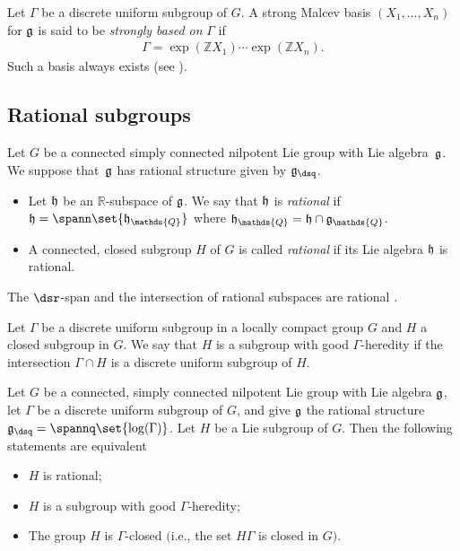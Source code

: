   Let $
\Gamma$ be a discrete uniform subgroup of $G$. A strong Malcev basis
$(X_1,\dotsc,X_n)$ for $\frak g$ is said to be \textit{strongly
based on} $\Gamma$ if
\begin{gather*}%
\Gamma= \exp(\mathds{Z}X_1)\dotsb \exp(\mathds{Z}X_n).
\end{gather*}
 Such a basis always exists (see \cite{Cor1,Matsushima1}).

\subsection{Rational subgroups}\label{2.4}

\begin{definition} Let $G$ be a connected
simply connected nilpotent Lie group with Lie algebra~$\frak g$. We
suppose that~$\frak g$ has rational structure given by $\frak
g_\dsq$.
\begin{itemize}\itemsep=0pt
  \item[$(1)$]
Let  $\frak h$ be an $\mathds{R}$-subspace of $\frak g$.  We say
that $\frak h$ is \textit{rational} if $\frak h = \spann\set{\frak
h_\mathds{Q}}$ where  $\frak h_\mathds{Q}= \frak h \cap \frak
g_\mathds{Q}$.
\item[$(2)$]
 A connected, closed subgroup
$H$ of $G$ is called \textit{rational} if its Lie algebra $\frak h$
is rational.
\end{itemize}
\end{definition}


\begin{remark}\label{ratio-intersection}
The $\dsr$-span and the intersection of rational subspaces are
rational \cite[Lemma 5.1.2]{Cor1}.
\end{remark}

\begin{definition} Let $\Gamma$ be a discrete uniform subgroup in a
locally compact group $G$ and $H$ a closed subgroup in $G$. We say
that $H$ is a subgroup with good $\Gamma$-heredity if the
intersection $\Gamma\cap H$ is a discrete uniform subgroup of $H$.
\end{definition}



\begin{theorem} Let $G$ be a connected, simply connected
nilpotent Lie group with Lie algebra  $\frak g$,  let $\Gamma$ be a
discrete uniform subgroup of $G$, and give $\frak g$ the rational
structure $\frak g_\dsq = \spannq\set{\log(\Gamma)}$.  Let $H$ be a
Lie subgroup of $G$. Then  the following statements are equivalent
\begin{itemize}\itemsep=0pt
  \item[$(1)$] $H$ is rational;
  \item[$(2)$] $H$ is a subgroup with good $\Gamma$-heredity;
  \item[$(3)$] The group $H$ is $\Gamma$-closed $($i.e., the set
  $H\Gamma$ is closed in $G)$.
\end{itemize}
\end{theorem}




